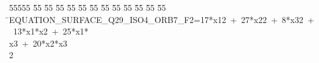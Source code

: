 %
%
\begin{tabbing}
55555 \= 55 \= 55 \= 55 \= 55 \= 55 \= 55 \= 55 \= 55 \= 55 \= 55 \= 55 \= 55 \= \>EQUATION\_SURFACE\_Q29\_ISO4\_ORB7\_F2=17*x12\ +\ 27*x22\ +\ 8*x32\ +\ 13*x1*x2\ +\ 25*x1*\\[0pt]
\>x3\ +\ 20*x2*x3\\[0pt]
2\>\end{tabbing}
